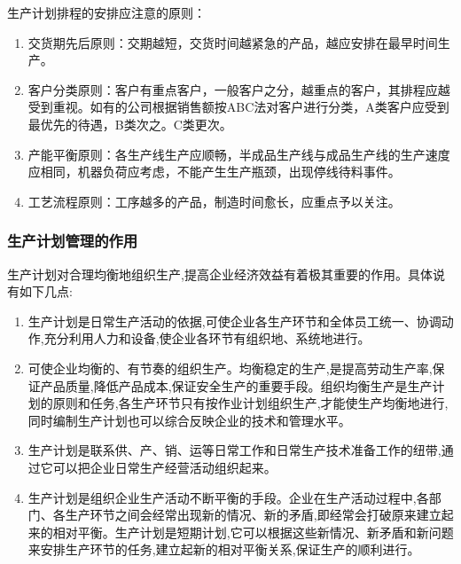    生产计划排程的安排应注意的原则：

    \begin{enumerate}
        \item  交货期先后原则：交期越短，交货时间越紧急的产品，越应安排在最早时间生产。
        \item  客户分类原则：客户有重点客户，一般客户之分，越重点的客户，其排程应越受到重视。如有的公司根据销售额按ABC法对客户进行分类，A类客户应受到最优先的待遇，B类次之。C类更次。
        \item  产能平衡原则：各生产线生产应顺畅，半成品生产线与成品生产线的生产速度应相同，机器负荷应考虑，不能产生生产瓶颈，出现停线待料事件。
        \item  工艺流程原则：工序越多的产品，制造时间愈长，应重点予以关注。
    \end{enumerate}

\subsubsection {生产计划管理的作用}

    生产计划对合理均衡地组织生产,提高企业经济效益有着极其重要的作用。具体说有如下几点:
    \begin{enumerate}
        \item  生产计划是日常生产活动的依据,可使企业各生产环节和全体员工统一、协调动作,充分利用人力和设备,使企业各环节有组织地、系统地进行。
       \item  可使企业均衡的、有节奏的组织生产。均衡稳定的生产,是提高劳动生产率,保证产品质量,降低产品成本,保证安全生产的重要手段。组织均衡生产是生产计划的原则和任务,各生产环节只有按作业计划组织生产,才能使生产均衡地进行,同时编制生产计划也可以综合反映企业的技术和管理水平。
        \item  生产计划是联系供、产、销、运等日常工作和日常生产技术准备工作的纽带,通过它可以把企业日常生产经营活动组织起来。
        \item  生产计划是组织企业生产活动不断平衡的手段。企业在生产活动过程中,各部门、各生产环节之间会经常出现新的情况、新的矛盾,即经常会打破原来建立起来的相对平衡。生产计划是短期计划,它可以根据这些新情况、新矛盾和新问题来安排生产环节的任务,建立起新的相对平衡关系,保证生产的顺利进行。
    \end{enumerate}
